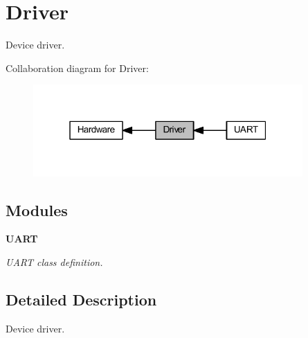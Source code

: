 \section{Driver}
\label{group___driver}


Device driver.  


Collaboration diagram for Driver\+:\nopagebreak
\begin{figure}[H]
\begin{center}
\leavevmode
\includegraphics[width=292pt]{group___driver}
\end{center}
\end{figure}
\subsection*{Modules}
\begin{DoxyCompactItemize}
\item 
\textbf{ U\+A\+RT}
\begin{DoxyCompactList}\small\item\em U\+A\+RT class definition. \end{DoxyCompactList}\end{DoxyCompactItemize}


\subsection{Detailed Description}
Device driver. 

